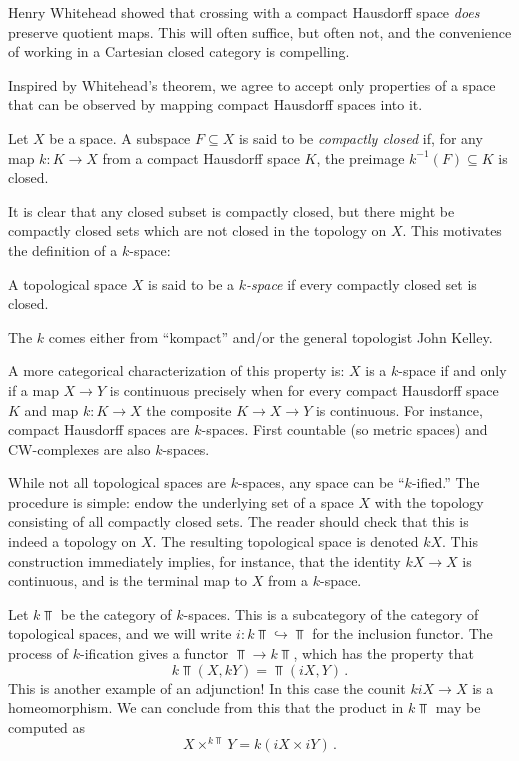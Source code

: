 Henry Whitehead showed that crossing with a compact Hausdorff space
{\em does} preserve quotient maps. This will often suffice, but often not, 
and the convenience of working in a Cartesian closed category is compelling. 

Inspired by Whitehead's theorem, we agree to accept only properties of a space
that can be observed by mapping compact Hausdorff spaces into it. 

\begin{definition}
    Let $X$ be a space.
    A subspace $F\subseteq X$ is said to be \emph{compactly closed} if,
    for any map $k:K\to X$ from a compact Hausdorff space $K$, 
    the preimage $k^{-1}(F)\subseteq K$ is closed.
\end{definition}
It is clear that any closed subset is compactly closed, but
there might be compactly closed sets which are not closed in the topology 
on $X$. This motivates the definition of a $k$-space:
\begin{definition}
    A topological space $X$ is said to be a \emph{$k$-space}
    if every compactly closed set is closed.
\end{definition}
The $k$ comes either from ``kompact'' and/or the general topologist 
John Kelley.

A more categorical characterization of this property is: 
$X$ is a $k$-space if and only if
a map $X\to Y$ is continuous precisely when for every compact Hausdorff space $K$ and map $k:K\to X$ the composite $K\to X\to Y$ is continuous.
For instance, compact Hausdorff spaces are $k$-spaces. First countable (so metric spaces) and CW-complexes are also $k$-spaces.

While not all topological spaces are $k$-spaces, any space can be 
``$k$-ified.''
The procedure is simple: endow the underlying set of a space $X$ with 
the topology consisting of all compactly closed sets.
The reader should check that this is indeed a topology on $X$.
The resulting topological space is denoted $kX$.
This construction immediately implies, for instance, that the identity 
$kX\to X$ is continuous, and is the terminal map to $X$ from a $k$-space.

Let $k\Top$ be the category of $k$-spaces.
This is a subcategory of the category of topological spaces, and we will write
$i:k\Top\hookrightarrow \Top$ for the inclusion functor.
The process of $k$-ification gives a functor $\Top\to k\Top$, which has the property that
$$k\Top(X,kY)=\Top(iX,Y)\,.$$
This is another example of an adjunction!
In this case the counit $kiX\to X$ is a homeomorphism.
We can conclude from this that the product in $k\Top$ may be computed as 
\[
X\times^{k\Top}Y=k(iX\times iY)\,.
\]

